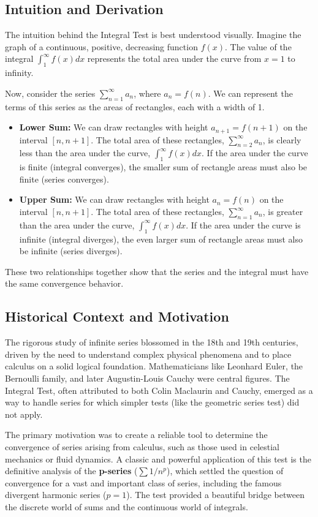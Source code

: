 \documentclass{article}
\begin{document}
\subsection{Intuition and Derivation}
The intuition behind the Integral Test is best understood visually. Imagine the graph of a continuous, positive, decreasing function $f(x)$. The value of the integral $\int_1^\infty f(x) dx$ represents the total area under the curve from $x=1$ to infinity.

Now, consider the series $\sum_{n=1}^{\infty} a_n$, where $a_n = f(n)$. We can represent the terms of this series as the areas of rectangles, each with a width of 1.

\begin{itemize}
    \item \textbf{Lower Sum:} We can draw rectangles with height $a_{n+1} = f(n+1)$ on the interval $[n, n+1]$. The total area of these rectangles, $\sum_{n=2}^{\infty} a_n$, is clearly less than the area under the curve, $\int_1^\infty f(x) dx$. If the area under the curve is finite (integral converges), the smaller sum of rectangle areas must also be finite (series converges).
    \item \textbf{Upper Sum:} We can draw rectangles with height $a_n = f(n)$ on the interval $[n, n+1]$. The total area of these rectangles, $\sum_{n=1}^{\infty} a_n$, is greater than the area under the curve, $\int_1^\infty f(x) dx$. If the area under the curve is infinite (integral diverges), the even larger sum of rectangle areas must also be infinite (series diverges).
\end{itemize}
These two relationships together show that the series and the integral must have the same convergence behavior.

\subsection{Historical Context and Motivation}
The rigorous study of infinite series blossomed in the 18th and 19th centuries, driven by the need to understand complex physical phenomena and to place calculus on a solid logical foundation. Mathematicians like Leonhard Euler, the Bernoulli family, and later Augustin-Louis Cauchy were central figures. The Integral Test, often attributed to both Colin Maclaurin and Cauchy, emerged as a way to handle series for which simpler tests (like the geometric series test) did not apply.

The primary motivation was to create a reliable tool to determine the convergence of series arising from calculus, such as those used in celestial mechanics or fluid dynamics. A classic and powerful application of this test is the definitive analysis of the \textbf{p-series} ($\sum 1/n^p$), which settled the question of convergence for a vast and important class of series, including the famous divergent harmonic series ($p=1$). The test provided a beautiful bridge between the discrete world of sums and the continuous world of integrals.
\end{document}
